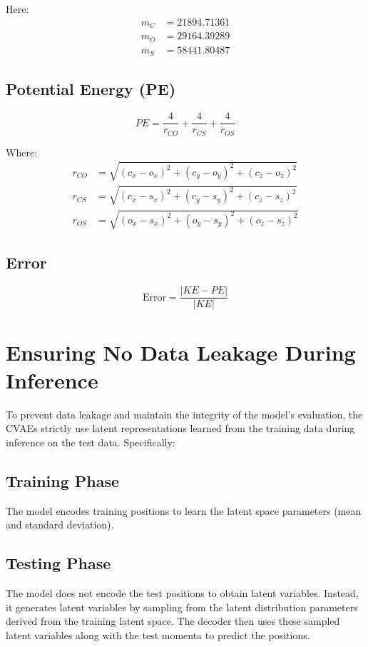 \documentclass[a4paper,10pt]{article}
\begin{document}
Here:
\begin{align}
m_C &= 21894.71361 \\
m_O &= 29164.39289 \\
m_S &= 58441.80487
\end{align}

\subsection{Potential Energy (PE)}
\begin{equation}
PE = \frac{4}{r_{CO}} + \frac{4}{r_{CS}} + \frac{4}{r_{OS}}
\end{equation}

Where:
\begin{align}
r_{CO} &= \sqrt{(c_x - o_x)^2 + (c_y - o_y)^2 + (c_z - o_z)^2} \\
r_{CS} &= \sqrt{(c_x - s_x)^2 + (c_y - s_y)^2 + (c_z - s_z)^2} \\
r_{OS} &= \sqrt{(o_x - s_x)^2 + (o_y - s_y)^2 + (o_z - s_z)^2}
\end{align}

\subsection{Error}
\begin{equation}
\text{Error} = \frac{\lvert KE - PE \rvert}{\lvert KE \rvert}
\end{equation}

\section{Ensuring No Data Leakage During Inference}

To prevent data leakage and maintain the integrity of the model’s evaluation, the CVAEs strictly use latent representations learned from the training data during inference on the test data. Specifically:

\subsection{Training Phase}
The model encodes training positions to learn the latent space parameters (mean and standard deviation).

\subsection{Testing Phase}
The model does not encode the test positions to obtain latent variables. Instead, it generates latent variables by sampling from the latent distribution parameters derived from the training latent space. The decoder then uses these sampled latent variables along with the test momenta to predict the positions.
\end{document}
